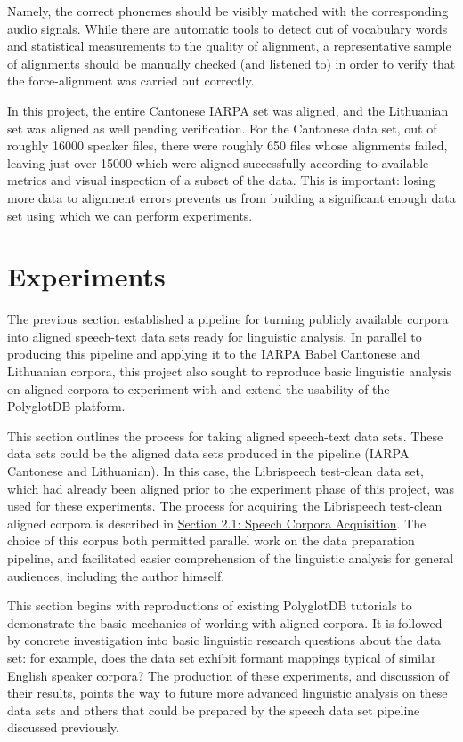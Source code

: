 \documentclass[11pt]{article}
\begin{document}
Namely, the correct phonemes should be visibly matched with the corresponding audio signals. While there are automatic tools to detect out of vocabulary words and statistical measurements to the quality of alignment, a representative sample of alignments should be manually checked (and listened to) in order to verify that the force-alignment was carried out correctly.

In this project, the entire Cantonese IARPA set was aligned, and the Lithuanian set was aligned as well pending verification. For the Cantonese data set, out of roughly 16000 speaker files, there were roughly 650 files whose alignments failed, leaving just over 15000 which were aligned successfully according to available metrics and visual inspection of a subset of the data. This is important: losing more data to alignment errors prevents us from building a significant enough data set using which we can perform experiments.

\section{Experiments}

The previous section established a pipeline for turning publicly available corpora into aligned speech-text data sets ready for linguistic analysis. In parallel to producing this pipeline and applying it to the IARPA Babel Cantonese and Lithuanian corpora, this project also sought to reproduce basic linguistic analysis on aligned corpora to experiment with and extend the usability of the PolyglotDB platform.

This section outlines the process for taking aligned speech-text data sets. These data sets could be the aligned data sets produced in the pipeline (IARPA Cantonese and Lithuanian). In this case, the Librispeech test-clean data set, which had already been aligned prior to the experiment phase of this project, was used for these experiments. The process for acquiring the Librispeech test-clean aligned corpora is described in \hyperlink{section.21}{Section 2.1: Speech Corpora Acquisition}. The choice of this corpus both permitted parallel work on the data preparation pipeline, and facilitated easier comprehension of the linguistic analysis for general audiences, including the author himself.

This section begins with reproductions of existing PolyglotDB tutorials to demonstrate the basic mechanics of working with aligned corpora. It is followed by concrete investigation into basic linguistic research questions about the data set: for example, does the data set exhibit formant mappings typical of similar English speaker corpora? The production of these experiments, and discussion of their results, points the way to future more advanced linguistic analysis on these data sets and others that could be prepared by the speech data set pipeline discussed previously.
\end{document}
